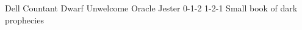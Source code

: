 
\begin{filledCS}%
  {Dell Countant}%
  {Dwarf}%
  {Unwelcome Oracle}%
  {Jester}%
  {{0}{-1}{-2}}%
  {{1}{-2}{-1}}%
  {%
    \setcounter{Academics}{1}
    \setcounter{Caving}{1}
    \setcounter{Performance}{1}
    \setcounter{Fate}{2}
    \shortsword
    \partialchain
  }%
  {\ritualcaster}%
  {Small book of dark prophecies}%

  \renewcommand\characterDebt{100 \glspl{sp}}
  \renewcommand\rank{Fodder}
  \renewcommand\charSpells{
    \showSpells{Fate3}

    \showSpells{Fate2}

    \showSpells{Fate1}

    \showSpells{Fate1}
  }

\end{filledCS}

